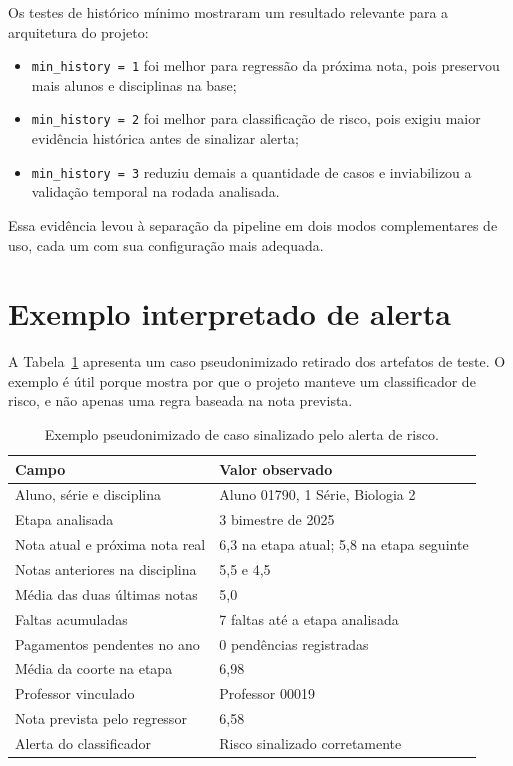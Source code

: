 Os testes de hist\'orico m\'inimo mostraram um resultado relevante para a arquitetura do projeto:

\begin{itemize}
    \item \texttt{min\_history = 1} foi melhor para regress\~ao da pr\'oxima nota, pois preservou mais alunos e disciplinas na base;
    \item \texttt{min\_history = 2} foi melhor para classifica\c{c}\~ao de risco, pois exigiu maior evid\^encia hist\'orica antes de sinalizar alerta;
    \item \texttt{min\_history = 3} reduziu demais a quantidade de casos e inviabilizou a valida\c{c}\~ao temporal na rodada analisada.
\end{itemize}

Essa evid\^encia levou \`a separa\c{c}\~ao da pipeline em dois modos complementares de uso, cada um com sua configura\c{c}\~ao mais adequada.

\section{Exemplo interpretado de alerta}
\label{sec:exemplo-alerta}

A Tabela~\ref{tab:exemplo-alerta} apresenta um caso pseudonimizado retirado dos artefatos de teste. O exemplo \'e \'util porque mostra por que o projeto manteve um classificador de risco, e n\~ao apenas uma regra baseada na nota prevista.

\begin{table}[ht]
\caption{Exemplo pseudonimizado de caso sinalizado pelo alerta de risco.}
\label{tab:exemplo-alerta}
\centering
\footnotesize
\begin{tabular}{p{4.9cm} p{8.5cm}}
\hline
\textbf{Campo} & \textbf{Valor observado} \\
\hline
Aluno, s\'erie e disciplina & Aluno 01790, 1\textordfeminine{} S\'erie, Biologia 2 \\
Etapa analisada & 3\textordmasculine{} bimestre de 2025 \\
Nota atual e pr\'oxima nota real & 6,3 na etapa atual; 5,8 na etapa seguinte \\
Notas anteriores na disciplina & 5,5 e 4,5 \\
M\'edia das duas \'ultimas notas & 5,0 \\
Faltas acumuladas & 7 faltas at\'e a etapa analisada \\
Pagamentos pendentes no ano & 0 pend\^encias registradas \\
M\'edia da coorte na etapa & 6,98 \\
Professor vinculado & Professor 00019 \\
Nota prevista pelo regressor & 6,58 \\
Alerta do classificador & Risco sinalizado corretamente \\
\hline
\end{tabular}
\end{table}

